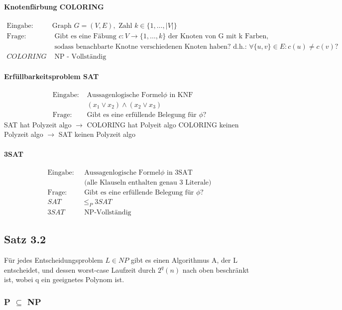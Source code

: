 \documentclass[a4paper, 10pt]{article}
\theoremstyle{definition}
\begin{document}
\paragraph{Knotenfärbung COLORING}
\begin{align*}
    \text{Eingabe: }& \text{Graph }G=(V,E), \text{ Zahl }k\in\{1,\dots,|V|\}\\
    \text{Frage: }& \text{ Gibt es eine Fäbung }c:V\to\{1,\dots,k\} \text{ der Knoten von G mit k Farben,}\\&\text{ sodass benachbarte Knotne verschiedenen Knoten haben? d.h.: }\forall\{u,v\}\in E:c(u)\neq c(v)?\\
    COLORING & \text{ NP - Vollständig}
\end{align*}
\paragraph{ Erfüllbarkeitsproblem SAT}
\begin{align*}
    \text{Eingabe: }&\text{Aussagenlogische Formel}\phi \text{ in KNF}\\
    &(x_1\lor x_2)\land (x_2\lor x_3)\\
    \text{Frage: }&\text{Gibt es eine erfüllende Belegung für }\phi?
\end{align*}
SAT hat Polyzeit algo $\to$ COLORING hat Polyeit algo
COLORING keinen Polyzeit algo $\to$ SAT keinen Polyzeit algo
\paragraph{3SAT}\begin{align*}
    \text{Eingabe: }&\text{ Aussagenlogische Formel$\phi$ in 3SAT}\\
    &\text{ (alle Klauseln enthalten genau 3 Literale)}\\
    \text{Frage: }&\text{ Gibt es eine erfüllende Belegung für $\phi$?}\\
    SAT&\leq_P 3SAT\\
    3SAT & \text{ NP-Vollständig}
\end{align*}
\subsection{Satz 3.2} Für jedes Entscheidungsproblem $L\in NP$ gibt es einen Algorithmus A, der L entscheidet, und dessen worst-case Laufzeit durch $2^q(n)$ nach oben beschränkt ist, wobei q ein geeignetes Polynom ist.
\subsubsection{P $\subseteq$ NP}
\end{document}
